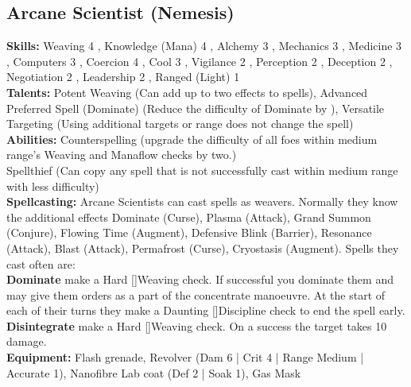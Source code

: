 \documentclass{article}
\newcommand\Hard{Hard [\Purple[3]]}
\newcommand\Daunting{Daunting [\Purple[4]]}
\begin{document}
\begin{multicols}{2}
{\subsection{Arcane Scientist (Nemesis)}
\begin{center}
\end{center}
\textbf{Skills:}
Weaving 4 \Yellow[4]\Green[1],
Knowledge (Mana) 4 \Yellow[4]\Green[1],
Alchemy 3 \Yellow[3]\Green[2],
Mechanics 3 \Yellow[3]\Green[2],
Medicine 3 \Yellow[3]\Green[2],
Computers 3 \Yellow[3]\Green[2],
Coercion 4 \Yellow[3]\Green[1],
Cool 3 \Yellow[3]\Green[1],
Vigilance 2 \Yellow[2]\Green[2],
Perception 2 \Yellow[2]\Green[2],
Deception 2 \Yellow[2]\Green[1],
Negotiation 2 \Yellow[2]\Green[1],
Leadership 2 \Yellow[2]\Green[1],
Ranged (Light) 1 \Yellow[1]\Green[2]\\
\textbf{Talents:}
Potent Weaving (Can add up to two effects to spells),
Advanced Preferred Spell (Dominate) (Reduce the difficulty of Dominate by \Purple[2]),
Versatile Targeting (Using additional targets or range does not change the spell)\\
\textbf{Abilities:}
Counterspelling (upgrade the difficulty of all foes within medium range's Weaving and Manaflow checks by two.)\\
Spellthief (Can copy any spell that is not successfully cast within medium range with \Purple[1] less difficulty)\\
\textbf{Spellcasting:} Arcane Scientists can cast spells as weavers. Normally they know the additional effects Dominate (Curse),  Plasma (Attack), Grand Summon (Conjure), Flowing Time (Augment), Defensive Blink (Barrier), Resonance (Attack), Blast (Attack), Permafrost (Curse), Cryostasis (Augment). Spells they cast often are:\\
\textbf{Dominate} make a \Hard Weaving check. If successful you dominate them and may give them orders as a part of the concentrate manoeuvre. At the start of each of their turns they make a \Daunting Discipline check to end the spell early.\\
\textbf{Disintegrate} make a \Hard Weaving check. On a success the target takes 10 damage.\\
\textbf{Equipment:} Flash grenade, Revolver (Dam 6 | Crit 4 | Range Medium | Accurate 1), Nanofibre Lab coat (Def 2 | Soak 1), Gas Mask
}

\vbox{
}
\end{multicols}
\end{document}
